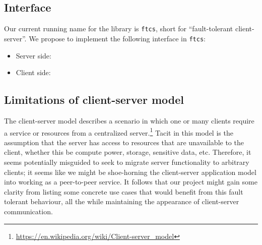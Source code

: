 \subsection{Interface}

Our current running name for the library is \texttt{ftcs}, short for ``fault-tolerant client-server''. We propose to implement the following interface in \texttt{ftcs}:

\begin{itemize}
	\item Server side:
    \begin{itemize}
    \end{itemize}
    \item Client side:
    	\begin{itemize}
    	\end{itemize}
\end{itemize}

\subsection{Limitations of client-server model}

The client-server model describes a scenario in which one or many clients require a service or resources from a centralized server.\footnote{\url{https://en.wikipedia.org/wiki/Client-server_model}} Tacit in this model is the assumption that the server has access to resources that are unavailable to the client, whether this be compute power, storage, sensitive data, etc. Therefore, it seems potentially misguided to seek to migrate server functionality to arbitrary clients; it seems like we might be shoe-horning the client-server application model into working as a peer-to-peer service. It follows that our project might gain some clarity from listing some concrete use cases that would benefit from this fault tolerant behaviour, all the while maintaining the appearance of client-server communication. 

